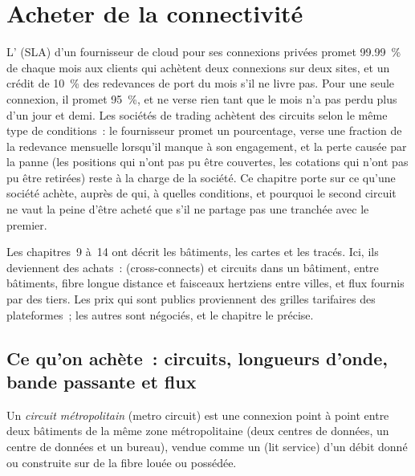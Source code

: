 \chapter{Acheter de la connectivité}\label{ch:nw:buying-connectivity}

L' (SLA) d'un fournisseur de cloud pour ses connexions privées promet 99.99~\% de chaque mois aux clients qui achètent deux
connexions sur deux sites, et un crédit de 10~\% des redevances de port du mois s'il ne livre pas. Pour une seule connexion, il promet 95~\%, et
ne verse rien tant que le mois n'a pas perdu plus d'un jour et demi. Les sociétés de trading achètent des circuits selon le même type de conditions~: le fournisseur
promet un pourcentage, verse une fraction de la redevance mensuelle lorsqu'il manque à son engagement, et la perte causée par la panne (les positions qui n'ont pas pu être couvertes, les cotations
qui n'ont pas pu être retirées) reste à la charge de la société. Ce chapitre porte sur ce qu'une société achète, auprès de qui, à quelles conditions, et pourquoi
le second circuit ne vaut la peine d'être acheté que s'il ne partage pas une tranchée avec le premier.

Les chapitres~9 à~14 ont décrit les bâtiments, les cartes et les tracés. Ici, ils deviennent des achats~:  (cross-connects) et circuits dans un
bâtiment,  entre bâtiments, fibre longue distance et faisceaux hertziens entre villes, et flux fournis par des tiers. Les prix qui sont
publics proviennent des grilles tarifaires des plateformes~; les autres sont négociés, et le chapitre le précise.

\section{Ce qu'on achète~: circuits, longueurs d'onde, bande passante et flux}

\begin{definition}\label{def:nw:buying-connectivity:metro}
Un \emph{circuit métropolitain} (metro circuit) est une connexion point à point entre deux bâtiments de la même zone métropolitaine (deux centres de données,
un centre de données et un bureau), vendue comme un  (lit service) d'un débit donné ou construite sur de la fibre louée ou possédée.
\end{definition}

